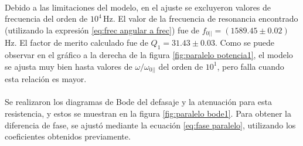 \paragraph{}
Debido a las limitaciones del modelo, en el ajuste se excluyeron valores de frecuencia del orden de $10^4\,$Hz. El valor de la frecuencia de resonancia  encontrado (utilizando la expresión  \eqref{eq:frec angular a frec}) fue de $f_{0||}=(1589.45\pm 0.02)\;$Hz. El factor de merito calculado fue de $Q_1=31.43\pm 0.03$. Como se puede observar en el gráfico a la derecha de la figura \ref{fig:paralelo potencia1}, el modelo se ajusta muy bien hasta valores de $\omega/\omega_{0||}$ del orden de $10^{1}$, pero falla cuando esta relación es mayor.
\paragraph{}
Se realizaron los diagramas de Bode del defasaje y la atenuación para esta resistencia,  y estos se muestran en la figura \ref{fig:paralelo bode1}. Para obtener la diferencia de fase, se ajustó mediante la ecuación \eqref{eq:fase paralelo}, utilizando los coeficientes obtenidos previamente.
